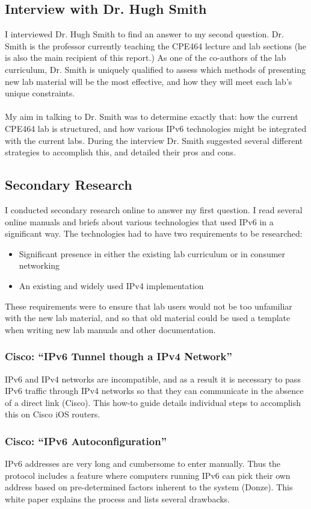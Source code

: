 \documentclass[12pt]{article}
\begin{document}
\subsection{Interview with Dr. Hugh Smith}
I interviewed Dr. Hugh Smith to find an answer to my second question. Dr. Smith is the professor currently teaching the CPE464 lecture and lab sections (he is also the main recipient of this report.) As one of the co-authors of the lab curriculum, Dr. Smith is uniquely qualified to assess which methods of presenting new lab material will be the most effective, and how they will meet each lab's unique constraints.\\\\
 My aim in talking to Dr. Smith was to determine exactly that: how the current CPE464 lab is structured, and how various IPv6 technologies might be integrated with the current labs. During the interview Dr. Smith suggested several different strategies to accomplish this, and detailed their pros and cons.

\subsection{Secondary Research}
I conducted secondary research online to answer my first question. I read several online manuals and briefs about various technologies that used IPv6 in a significant way. The technologies had to have two requirements to be researched:
\begin{itemize}
\item Significant presence in either the existing lab curriculum or in consumer networking
\item An existing and widely used IPv4 implementation
\end{itemize}
These requirements were to ensure that lab users would not be too unfamiliar with the new lab material, and so that old material could be used a template when writing new lab manuals and other documentation.

\subsubsection{Cisco: ``IPv6 Tunnel though a IPv4 Network''}
IPv6 and IPv4 networks are incompatible, and as a result it is necessary to pass IPv6 traffic through IPv4 networks so that they can communicate in the absence of a direct link (Cisco). This how-to guide details individual steps to accomplish this on Cisco iOS routers.

\subsubsection{Cisco: ``IPv6 Autoconfiguration''}
IPv6 addresses are very long and cumbersome to enter manually. Thus the protocol includes a feature where computers running IPv6 can pick their own address based on pre-determined factors inherent to the system (Donze). This white paper explains the process and lists several drawbacks.
\end{document}
